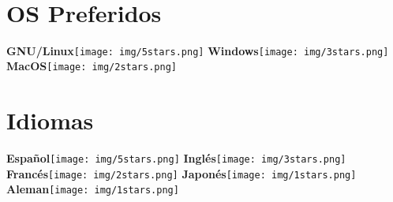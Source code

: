 \documentclass[]{friggeri-cv}
\begin{document}
\begin{aside}
~
~
~
 

  \section{OS Preferidos}
    \textbf{GNU/Linux}\texttt{[image: img/5stars.png]}
    \textbf{Windows}\texttt{[image: img/3stars.png]}
    \textbf{MacOS}\texttt{[image: img/2stars.png]}
    ~
  \section{Idiomas}
    \textbf{Español}\texttt{[image: img/5stars.png]}
    \textbf{Inglés}\texttt{[image: img/3stars.png]}
    \textbf{Francés}\texttt{[image: img/2stars.png]}
    \textbf{Japonés}\texttt{[image: img/1stars.png]}
    \textbf{Aleman}\texttt{[image: img/1stars.png]}
    

\end{aside}
\end{document}
